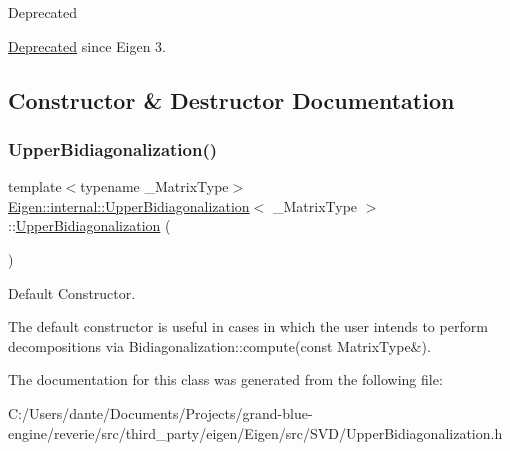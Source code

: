 \begin{DoxyRefDesc}{Deprecated}
\item[\mbox{\hyperlink{deprecated__deprecated000039}{Deprecated}}]since Eigen 3. \end{DoxyRefDesc}


\subsection{Constructor \& Destructor Documentation}
\mbox{\label{class_eigen_1_1internal_1_1_upper_bidiagonalization_aa37a7ca5f5e86e3efbc6907d03d89340}} 
\subsubsection{\texorpdfstring{UpperBidiagonalization()}{UpperBidiagonalization()}}
{\footnotesize\ttfamily template$<$typename \+\_\+\+Matrix\+Type$>$ \\
\mbox{\hyperlink{class_eigen_1_1internal_1_1_upper_bidiagonalization}{Eigen\+::internal\+::\+Upper\+Bidiagonalization}}$<$ \+\_\+\+Matrix\+Type $>$\+::\mbox{\hyperlink{class_eigen_1_1internal_1_1_upper_bidiagonalization}{Upper\+Bidiagonalization}} (\begin{DoxyParamCaption}{ }\end{DoxyParamCaption})\hspace{0.3cm}{\ttfamily [inline]}}



Default Constructor. 

The default constructor is useful in cases in which the user intends to perform decompositions via Bidiagonalization\+::compute(const Matrix\+Type\&). 

The documentation for this class was generated from the following file\+:\begin{DoxyCompactItemize}
\item 
C\+:/\+Users/dante/\+Documents/\+Projects/grand-\/blue-\/engine/reverie/src/third\+\_\+party/eigen/\+Eigen/src/\+S\+V\+D/Upper\+Bidiagonalization.\+h\end{DoxyCompactItemize}
